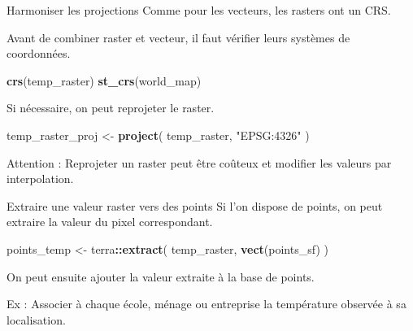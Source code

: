 \documentclass[
  10pt,
  ignorenonframetext,
]{beamer}
\newenvironment{Shaded}{\begin{snugshade}}{\end{snugshade}}
\newcommand{\DecValTok}[1]{\textcolor[rgb]{0.00,0.00,0.81}{#1}}
\newcommand{\FunctionTok}[1]{\textcolor[rgb]{0.13,0.29,0.53}{\textbf{#1}}}
\newcommand{\NormalTok}[1]{#1}
\newcommand{\OtherTok}[1]{\textcolor[rgb]{0.56,0.35,0.01}{#1}}
\newcommand{\SpecialCharTok}[1]{\textcolor[rgb]{0.81,0.36,0.00}{\textbf{#1}}}
\newcommand{\StringTok}[1]{\textcolor[rgb]{0.31,0.60,0.02}{#1}}
\begin{document}
\begin{frame}[fragile]{Harmoniser les projections}
\label{harmoniser-les-projections-1}
Comme pour les vecteurs, les rasters ont un CRS.

Avant de combiner raster et vecteur, il faut vérifier leurs systèmes de
coordonnées.

\begin{Shaded}
\begin{Highlighting}[]
\FunctionTok{crs}\NormalTok{(temp\_raster)}
\FunctionTok{st\_crs}\NormalTok{(world\_map)}
\end{Highlighting}
\end{Shaded}

Si nécessaire, on peut reprojeter le raster.

\begin{Shaded}
\begin{Highlighting}[]
\NormalTok{temp\_raster\_proj }\OtherTok{\textless{}{-}} \FunctionTok{project}\NormalTok{(}
\NormalTok{  temp\_raster,}
  \StringTok{"EPSG:4326"}
\NormalTok{)}
\end{Highlighting}
\end{Shaded}

Attention : Reprojeter un raster peut être coûteux et modifier les
valeurs par interpolation.
\end{frame}

\begin{frame}[fragile]{Extraire une valeur raster vers des points}
\label{extraire-une-valeur-raster-vers-des-points}
Si l'on dispose de points, on peut extraire la valeur du pixel
correspondant.

\begin{Shaded}
\begin{Highlighting}[]
\NormalTok{points\_temp }\OtherTok{\textless{}{-}}\NormalTok{ terra}\SpecialCharTok{::}\FunctionTok{extract}\NormalTok{(}
\NormalTok{  temp\_raster,}
  \FunctionTok{vect}\NormalTok{(points\_sf)}
\NormalTok{)}
\end{Highlighting}
\end{Shaded}

On peut ensuite ajouter la valeur extraite à la base de points.

\begin{Shaded}
\end{Shaded}

Ex : Associer à chaque école, ménage ou entreprise la température
observée à sa localisation.
\end{frame}
\end{document}
